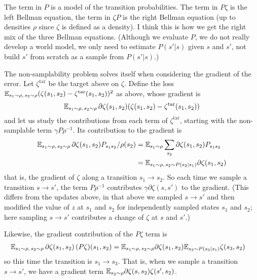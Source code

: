 \documentclass[11pt,a4paper]{article}
\newcommand{\zetatar}{\zeta^\mathrm{tar}}
\begin{document}
The term in $P$ is a model of the transition probabilities. The term in
$P\zeta$ is the left Bellman equation, the term in $\zeta P$ is the right
Bellman equation (up to densities $\rho$ since $\zeta$ is defined as a
density). I think this is how we get the right mix of the three Bellman
equations. (Although we evaluate $P$, we do not really develop a world
model, we only need to estimate $P(s'|s)$ given $s$ and $s'$, not build
$s'$ from scratch as a sample from $P(s'|s)$.)

The non-samplability problem solves itself when considering the gradient of the
error. Let $\zetatar$ be the target above on $\zeta$. Define the loss
$\E_{s_1\sim \rho,\,s_2\sim \rho} (\zeta(s_1,s_2)-\zetatar(s_1,s_2))^2$
as above, whose gradient is
\begin{equation}
\E_{s_1\sim \rho,\,s_2\sim \rho} \,\partial \zeta(s_1,s_2)(\zeta(s_1,s_2)-\zetatar(s_1,s_2))
\end{equation}
and let us study the contributions from each term of $\zetatar$, starting
with the non-samplable term $\gamma P \rho^{-1}$. Its contribution to the
gradient is
\begin{align}
\mathbb{E}_{s_1\sim \rho,\,s_2\sim \rho} \,\partial \zeta(s_1,s_2)
P_{s_1s_2}/\rho(s_2)&=\mathbb{E}_{s_1\sim \rho}\sum_{s_2} \partial
\zeta(s_1,s_2)P_{s_1s_2}
\\&=\mathbb{E}_{s_1\sim \rho,\,s_2\sim P(s_2|s_1)}\partial
\zeta(s_1,s_2)
\end{align}
that is, the gradient of $\zeta$ along a transition $s_1\to s_2$.
So each time we sample a transition $s\to s'$, the term $
P\rho^{-1}$ contributes $\gamma \partial
\zeta(s,s')$ to the gradient. (This differs from the updates above, in
that above we sampled $s\to s'$ and then modified the value of $z$ at
$s_1$ and $s_2$ for independently sampled states $s_1$ and $s_2$; here
sampling $s\to s'$ contributes a change of $\zeta$ at $s$ and $s'$.)

Likewise, the gradient contribution of the $P\zeta$ term is
\begin{align}
\mathbb{E}_{s_1\sim \rho,\,s_2\sim \rho} \,\partial \zeta(s_1,s_2)
\,(P\zeta)(s_1,s_2)&=\mathbb{E}_{s_1\sim \rho,\,s_2\sim \rho}
\partial \zeta(s_1,s_2)\mathbb{E}_{s_3\sim P(s_3|s_1)}\zeta(s_3,s_2)
\end{align}
so this time the transition is $s_1\to s_3$. That is, when we sample a
transition $s\to s'$, we have a gradient term $\mathbb{E}_{s_2\sim \rho}
\partial\zeta(s,s_2)\zeta(s',s_2)$.
\end{document}
